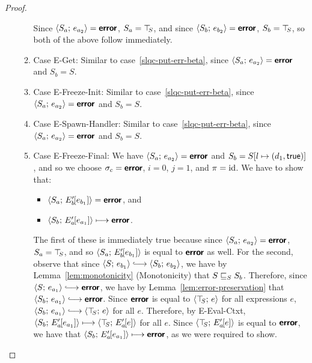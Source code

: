 \begin{proof}
\begin{enumerate}
\begin{enumerate}
      Since $\langle S_a;\, e_{a_2} \rangle = \textbf{\textsf{error}}$, $S_a = \top\hspace{-0.85mm}_{S}$, and since
      $\langle S_b;\, e_{b_2} \rangle = \textbf{\textsf{error}}$, $S_b = \top\hspace{-0.85mm}_{S}$, so both of the
      above follow immediately.

    \item \label{slqc-put-err-get}Case {\sc E-Get}: Similar to
      case~\ref{slqc-put-err-beta}, since $\langle S_a;\, e_{a_2} \rangle =
      \textbf{\textsf{error}}$ and $S_b = S$.
    \item \label{slqc-put-err-freeze-init}Case {\sc E-Freeze-Init}:
      Similar to case~\ref{slqc-put-err-beta}, since
      $\langle S_a;\, e_{a_2} \rangle = \textbf{\textsf{error}}$ and $S_b = S$.
    \item \label{slqc-put-err-spawn-handler}Case {\sc
      E-Spawn-Handler}: Similar to case~\ref{slqc-put-err-beta}, since
      $\langle S_a;\, e_{a_2} \rangle = \textbf{\textsf{error}}$ and $S_b = S$.
    \item \label{slqc-put-err-freeze-final}Case {\sc E-Freeze-Final}:
      We have $\langle S_a;\, e_{a_2} \rangle = \textbf{\textsf{error}}$ and $S_b =
      S[l \mapsto (d_1, \textsf{true})]$, and so we choose $\sigma_c =
      \textbf{\textsf{error}}$, $i = 0$, $j = 1$, and $\pi = \mathrm{id}$.  We have to show
      that:
      \begin{itemize}
      \item $\langle S_a;\, E'_b\hspace{-1mm}\left[e_{b_1}\right] \rangle = \textbf{\textsf{error}}$,
        and
      \item $\langle S_b;\, E'_a\hspace{-1mm}\left[e_{a_1}\right] \rangle \longmapsto
        \textbf{\textsf{error}}$.
      \end{itemize}

      The first of these is immediately true because since
      $\langle S_a;\, e_{a_2} \rangle = \textbf{\textsf{error}}$, $S_a = \top\hspace{-0.85mm}_{S}$, and so
      $\langle S_a;\, E'_b\hspace{-1mm}\left[e_{b_1}\right] \rangle$ is equal to $\textbf{\textsf{error}}$ as
      well.  For the second, observe that since $\config{S}{e_{b_1}}
      \parstepsto \config{S_b}{e_{b_2}}$, we have by
      Lemma~\ref{lem:monotonicity} (Monotonicity) that
      $S \sqsubseteq_S S_b$.  Therefore, since $\config{S}{e_{a_1}}
      \parstepsto \error$, we have by
      Lemma~\ref{lem:error-preservation} that $\config{S_b}{e_{a_1}}
      \parstepsto \error$.  Since $\textbf{\textsf{error}}$ is equal to
      $\langle \top\hspace{-0.85mm}_{S};\, e \rangle$ for all expressions $e$,
      $\config{S_b}{e_{a_1}} \parstepsto \config{\topS}{e}$ for all
      $e$.  Therefore, by {\sc E-Eval-Ctxt},
      $\langle S_b;\, E'_a\hspace{-1mm}\left[e_{a_1}\right] \rangle \longmapsto
      \langle \top\hspace{-0.85mm}_{S};\, E'_a\hspace{-1mm}\left[e\right] \rangle$ for all $e$.  Since
      $\langle \top\hspace{-0.85mm}_{S};\, E'_a\hspace{-1mm}\left[e\right] \rangle$ is equal to $\textbf{\textsf{error}}$, we
      have that $\langle S_b;\, E'_a\hspace{-1mm}\left[e_{a_1}\right] \rangle \longmapsto
      \textbf{\textsf{error}}$, as we were required to show.


\end{enumerate}
\end{enumerate}
\end{proof}
